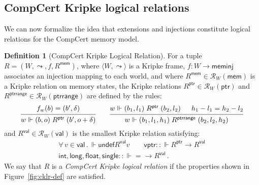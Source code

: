 \documentclass[11pt,oneside,draft]{book}
\theoremstyle{definition}
\newtheorem{definition}[theorem]{Definition}
\newcommand{\kw}[1]{\ensuremath{ \mathsf{#1} }}
\begin{document}

\subsection{CompCert Kripke logical relations} \label{sec:cklrdef} %

We can now formalize the idea that
extensions and injections
constitute logical relations for the CompCert memory model.

\begin{definition}[CompCert Kripke Logical Relation] \label{def:cklr} %
For a tuple $R = (W, \leadsto, f, R^\kw{mem})$,
where
$\langle W, \leadsto \rangle$ is a Kripke frame,
$f : W \rightarrow \kw{meminj}$
associates an injection mapping to each world, and where
$R^\kw{mem} \in \mathcal{R}_{W}(\kw{mem})$
is a Kripke relation on memory states,
the Kripke relations
$R^\kw{ptr} \in \mathcal{R}_W(\kw{ptr})$ and
$R^\kw{ptrrange} \in \mathcal{R}_W(\kw{ptrrange})$
are defined by the rules:
\[
  \begin{prooftree}
    \hypo{f_w(b) = (b', \delta)}
    \infer1{w \Vdash (b, o) \mathrel{R^\kw{ptr}} (b', o + \delta)}
  \end{prooftree}
  \qquad
  \begin{prooftree}
    \hypo{w \Vdash (b_1, l_1) \mathrel{R^\kw{ptr}} (b_2, l_2)}
    \hypo{h_1 - l_1 = h_2 - l_2}
    \infer2{w \Vdash (b_1, l_1, h_1) \mathrel{R^\kw{ptrrange}} (b_2, l_2, h_2)}
  \end{prooftree}
\]
and
$R^\kw{val} \in \mathcal{R}_W(\kw{val})$
is the smallest Kripke relation satisfying:
\begin{gather*}
  \forall \, v \in \kw{val} \,.\,
    \Vdash \kw{undef} \mathrel{R^\kw{val}} v \qquad
  \kw{vptr} :: {\Vdash R^\kw{ptr} \rightarrow R^\kw{val}} \\
  \kw{int}, \kw{long}, \kw{float}, \kw{single} ::
    {\Vdash {=} \rightarrow R^\kw{val}} \,.
\end{gather*}
We say that $R$ is a \emph{CompCert Kripke logical relation}
if the properties shown in Figure~\ref{fig:cklr-def} are satisfied.
\end{definition}
\end{document}
